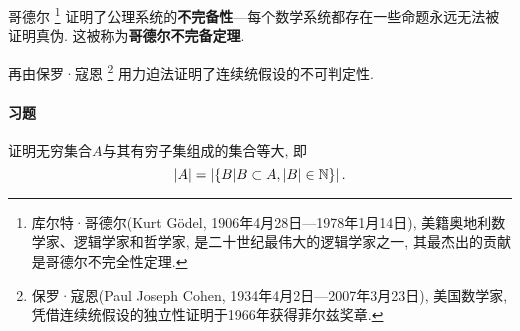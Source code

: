 哥德尔
\footnote{库尔特·哥德尔(Kurt Gödel, 1906年4月28日—1978年1月14日),
美籍奥地利数学家、逻辑学家和哲学家, 是二十世纪最伟大的逻辑学家之一, 其最杰出的贡献是哥德尔不完全性定理. }
证明了公理系统的\textbf{不完备性}---每个数学系统都存在一些命题永远无法被证明真伪.
这被称为\textbf{哥德尔不完备定理}.

再由保罗·寇恩
\footnote{保罗·寇恩(Paul Joseph Cohen, 1934年4月2日---2007年3月23日), 美国数学家,
凭借连续统假设的独立性证明于1966年获得菲尔兹奖章. }
用力迫法证明了连续统假设的不可判定性.

\paragraph{习题}
证明无穷集合$A$与其有穷子集组成的集合等大, 即
\[
  \left\lvert A \right\rvert = \left\lvert  \{ B| B \subset A, \left\lvert B \right\rvert \in \mathbb{N} \}   \right\rvert
.\]

